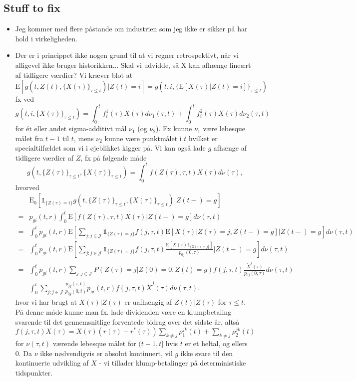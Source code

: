 \documentclass[12pt]{article}
\newcommand{\E}{\text{E}}
\newcommand{\indic}[1]{\mathds{1}_{ \{ #1 \} }}
\theoremstyle{my_thm}
\begin{document}
\subsection*{Stuff to fix}
\begin{itemize}
\item Jeg kommer med flere påstande om industrien som jeg ikke er sikker på har hold i virkeligheden.
\item Der er i princippet ikke nogen grund til at vi regner retrospektivt, når vi alligevel ikke bruger historikken... Skal vi udvidde, så X kan afhænge lineært af tidligere værdier? Vi kræver blot at
$$
\E[g(t,Z(t),\{ X(\tau) \}_{\tau\leq t})|Z(t)=i]=g(t,i,\{ \E[X(\tau)|Z(t)=i] \}_{\tau \leq t})$$
fx ved
$$
g(t,i,\{X(\tau)\}_{\tau \leq t})=\int_0^t f^1_i(\tau) X(\tau) d\nu_1(\tau,t) + \int_0^t f^2_i(\tau) X(\tau) d\nu_2(\tau,t)
$$
for ét eller andet sigma-additivt mål $\nu_1$ (og $\nu_2$). Fx kunne $\nu_1$ være lebesque målet fra $t-1$ til $t$, mens $\nu_2$ kunne være punktmålet i $t$ hvilket er specialtilfældet som vi i øjeblikket kigger på. Vi kan også lade $g$ afhænge af tidligere værdier af $Z$, fx på følgende måde
$$
g(t,\{Z(\tau)\}_{\tau\leq t},\{X(\tau)\}_{\tau\leq t})=
\int_0^t f(Z(\tau),\tau,t) X(\tau) d\nu(\tau),
$$
hvorved
\begin{align*}
&\E_0[\indic{Z(r)=i}g(t,\{Z(\tau)\}_{\tau\leq t},\{X(\tau)\}_{\tau\leq t})|Z(t-)=g]
\\
=&
p_{gi}(t,r)\int_0^t \E[ f(Z(\tau),\tau,t) X(\tau)|Z(t-)=g] d\nu(\tau,t)
\\
=&
\int_0^t p_{gi}(t,r) \E \left[ \sum_{j:j \in \mathcal{J}}  \indic{Z(\tau)=j} f(j,\tau,t) \E[X(\tau)|Z(\tau)=j,Z(t-)=g] \bigg| Z(t-)=g \right] d\nu(\tau,t)
\\
=&
\int_0^t p_{gi}(t,r) \E \left[ \sum_{j:j \in \mathcal{J}}  \indic{Z(\tau)=j} f(j,\tau,t) \frac{\E[X(\tau)\indic{Z(\tau)=j}]}{p_{0j}(0,\tau)} \bigg| Z(t-)=g \right] d\nu(\tau,t)
\\
=&
\int_0^t p_{gi}(t,r) \sum_{j:j \in \mathcal{J}}  P(Z(\tau)=j|Z(0)=0,Z(t)=g) f(j,\tau,t) \frac{\tilde{X}^j(\tau)}{p_{0j}(0,\tau)}  d\nu(\tau,t)
\\
=&
\int_0^t \sum_{j:j \in \mathcal{J}} \frac{p_{jg}(\tau,t)}{p_{0g}(0,t)} p_{gi}(t,r) f(j,\tau,t) \tilde{X}^j(\tau) d\nu(\tau,t).
\end{align*}
hvor vi har brugt at $X(\tau)|Z(\tau)$ er uafhængig af $Z(t)|Z(\tau)$ for $\tau\leq t$. På denne måde kunne man fx. lade dividenden være en klumpbetaling svarende til det gennemsnitlige forventede bidrag over det sidste år, altså $f(j,\tau,t)X(\tau)=X(\tau)(r(\tau)-r^*(\tau))\sum_{k\neq j} \rho_1^{jk}(t)+\sum_{k\neq j} \rho_2^{jk}(t)$ for $\nu(\tau,t)$ værende lebesque målet for $(t-1,t]$ hvis $t$ er et heltal, og ellers 0. Da $\nu$ ikke nødvendigvis er absolut kontinuert, vil $g$ ikke svare til den kontinuerte udvikling af $X$ - vi tillader klump-betalinger på deterministiske tidspunkter.

\end{itemize}
\end{document}
